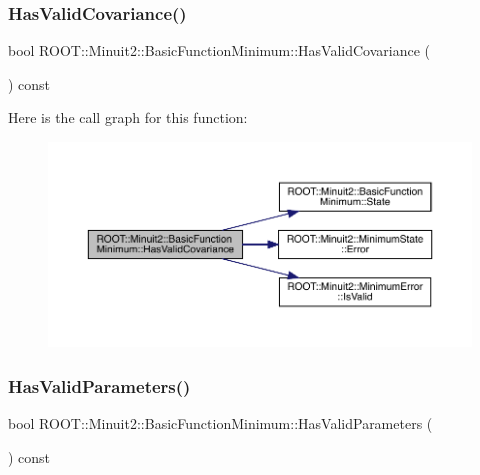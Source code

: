 \subsubsection{\texorpdfstring{HasValidCovariance()}{HasValidCovariance()}\hspace{0.1cm}{\footnotesize\ttfamily [2/2]}}
{\footnotesize\ttfamily bool R\+O\+O\+T\+::\+Minuit2\+::\+Basic\+Function\+Minimum\+::\+Has\+Valid\+Covariance (\begin{DoxyParamCaption}{ }\end{DoxyParamCaption}) const\hspace{0.3cm}{\ttfamily [inline]}}

Here is the call graph for this function\+:
\nopagebreak
\begin{figure}[H]
\begin{center}
\leavevmode
\includegraphics[width=350pt]{de/d25/classROOT_1_1Minuit2_1_1BasicFunctionMinimum_a2bf14deac281ae646e88a2fa6d0b5012_cgraph}
\end{center}
\end{figure}
\mbox{\label{classROOT_1_1Minuit2_1_1BasicFunctionMinimum_a91fedd04974dd5d27981eb758405670f}} 
\subsubsection{\texorpdfstring{HasValidParameters()}{HasValidParameters()}\hspace{0.1cm}{\footnotesize\ttfamily [1/2]}}
{\footnotesize\ttfamily bool R\+O\+O\+T\+::\+Minuit2\+::\+Basic\+Function\+Minimum\+::\+Has\+Valid\+Parameters (\begin{DoxyParamCaption}{ }\end{DoxyParamCaption}) const\hspace{0.3cm}{\ttfamily [inline]}}

